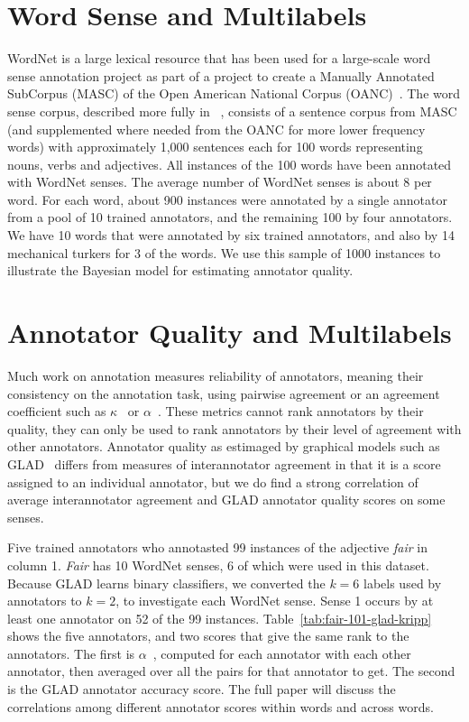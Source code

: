 \documentclass[11pt]{article}
\begin{document}
\section{Word Sense and Multilabels} %

WordNet is a large lexical resource that has been used for a
large-scale word sense annotation project as part of a project to
create a Manually Annotated SubCorpus (MASC) of the Open American
National Corpus (OANC)~\cite{ideEtAl10}. The word sense corpus,
described more fully in ~\cite{passonneauEtAl12}, consists of a
sentence corpus from MASC (and supplemented where needed from the OANC
for more lower frequency words) with approximately 1,000 sentences
each for 100 words representing nouns, verbs and adjectives. All
instances of the 100 words have been annotated with WordNet senses.
The average number of WordNet senses is about 8 per word. For each
word, about 900 instances were annotated by a single annotator from a
pool of 10 trained annotators, and the remaining 100 by four
annotators. We have 10 words that were annotated by six trained
annotators, and also by 14 mechanical turkers for 3 of the words. We
use this sample of 1000 instances to illustrate the Bayesian model for
estimating annotator quality.

\section{Annotator Quality and Multilabels} %

Much work on annotation measures reliability of annotators, meaning
their consistency on the annotation task, using pairwise agreement or
an agreement coefficient such as $\kappa$~\cite{cohen60} or
$\alpha$~\cite{krippendorff80}. These metrics cannot rank annotators
by their quality, they can only be used to rank annotators by their
level of agreement with other annotators. Annotator quality as
estimaged by graphical models such as GLAD~\cite{whitehillEtAl-2009}
differs from measures of interannotator agreement in that it is a
score assigned to an individual annotator, but we do find a strong
correlation of average interannotator agreement and GLAD annotator
quality scores on some senses.

Five trained annotators who annotasted 99 instances of the adjective
{\it fair} in column 1. {\it Fair} has 10 WordNet senses, 6 of which
were used in this dataset. Because GLAD learns binary classifiers, we
converted the $k=6$ labels used by annotators to $k=2$, to investigate
each WordNet sense. Sense 1 occurs by at least one annotator on 52 of
the 99 instances. Table~\ref{tab:fair-101-glad-kripp} shows the five
annotators, and two scores that give the same rank to the annotators.
The first is $\alpha$~\cite{krippendorff80}, computed for each
annotator with each other annotator, then averaged over all the pairs
for that annotator to get. The second is the GLAD annotator accuracy
score. The full paper will discuss the correlations among different
annotator scores within words and across words.
\end{document}
